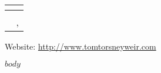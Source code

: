 \documentclass[11pt]{article}
\author{Thomas Torsney-Weir}
\makeatletter
\newcommand*{\theauthor}{}
\newcommand*{\theemail}{}
\newcommand*{\thephone}{}
\newcommand*{\theaddress}{}
\newlength{\mytitlewidth}
\renewcommand*{\maketitle}{%
  \begin{tabular*}{\mytitlewidth}{@{}l@{\extracolsep{\fill}}r@{\extracolsep{0ex}~}}
  \textbf{\large{\theauthor}} &  \\ 
    \hline
    \multicolumn{2}{r}{\theaddress} \\ 
    \multicolumn{2}{r}{\thephone, \theemail}
  \end{tabular*}
}
\makeatother
\begin{document}
%
%

\maketitle


Website: \url{http://www.tomtorsneyweir.com}

$body$
\end{document}
